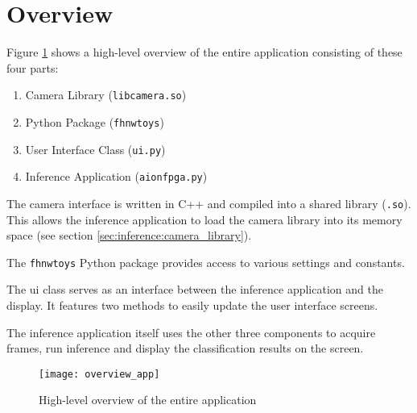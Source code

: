 \section{Overview}
\label{sec:inference:overview}

Figure \ref{fig:overview_app} shows a high-level overview of the entire application consisting of these four parts:
\begin{enumerate}
  \item Camera Library (\texttt{libcamera.so})
  \item Python Package (\texttt{fhnwtoys})
  \item User Interface Class (\texttt{ui.py})
  \item Inference Application (\texttt{aionfpga.py})
\end{enumerate}

The camera interface is written in C++ and compiled into a shared library (\texttt{.so}).
This allows the inference application to load the camera library into its memory space (see section \ref{sec:inference:camera_library}).

The \texttt{fhnwtoys} Python package provides access to various settings and constants.

The \acrlong{ui} class serves as an interface between the inference application and the display.
It features two methods to easily update the user interface screens.

The inference application itself uses the other three components to acquire frames, run inference and display the classification results on the screen.

\begin{figure}
  \centering
  \texttt{[image: overview\_app]}
  \caption{High-level overview of the entire application}
  \label{fig:overview_app}
\end{figure}
